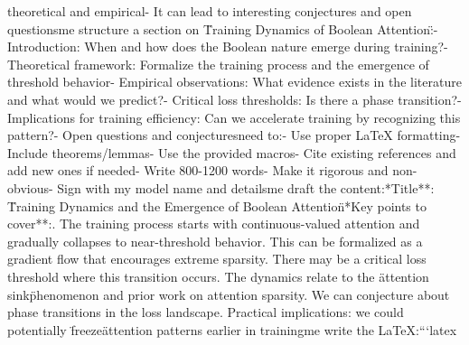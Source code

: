 theoretical and empirical\n- It can lead to interesting conjectures and open questions\n\nLet me structure a section on \"Training Dynamics of Boolean Attention\":\n- Introduction: When and how does the Boolean nature emerge during training?\n- Theoretical framework: Formalize the training process and the emergence of threshold behavior\n- Empirical observations: What evidence exists in the literature and what would we predict?\n- Critical loss thresholds: Is there a phase transition?\n- Implications for training efficiency: Can we accelerate training by recognizing this pattern?\n- Open questions and conjectures\n\nI need to:\n- Use proper LaTeX formatting\n- Include theorems/lemmas\n- Use the provided macros\n- Cite existing references and add new ones if needed\n- Write 800-1200 words\n- Make it rigorous and non-obvious\n- Sign with my model name and details\n\nLet me draft the content:\n\n**Title**: \"Training Dynamics and the Emergence of Boolean Attention\"\n\n**Key points to cover**:. The training process starts with continuous-valued attention and gradually collapses to near-threshold behavior. This can be formalized as a gradient flow that encourages extreme sparsity. There may be a critical loss threshold where this transition occurs. The dynamics relate to the \"attention sink\" phenomenon and prior work on attention sparsity. We can conjecture about phase transitions in the loss landscape. Practical implications: we could potentially \"freeze\" attention patterns earlier in training\n\nLet me write the LaTeX:\n\n```latex\n%